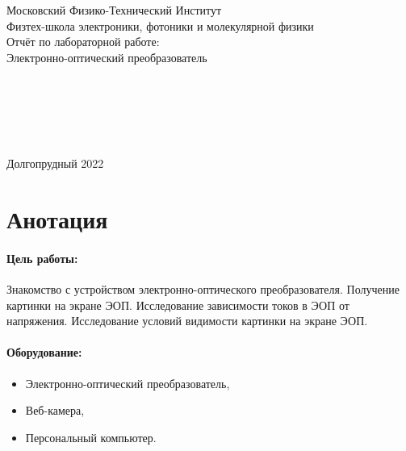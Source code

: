 \documentclass[a4paper,12pt]{article} %
\begin{document}



\begin{center}
{\LARGE Московский Физико-Технический Институт}
\\
{\large Физтех-школа электроники, фотоники и молекулярной физики }
\\
\vspace{8cm}
{\LARGE Отчёт по лабораторной работе:}
\\
{\Huge Электронно-оптический преобразователь} 
\\
\vspace{5cm}
\raggedright 
\hspace{8cm}{\large Выполнили работу студенты }\\
\hspace{8cm}{\large группы Б04-005:}\\
\hspace{8cm}{\large Давыдов Владислав}\\
\hspace{8cm}{\large Карташов Констанин}\\
\hspace{8cm}{\large Корнеев Николай}\\

\vspace{\fill}
\center
{\large Долгопрудный 2022}

\end{center}

\newpage


\section{Анотация}

\paragraph{Цель работы:} 
Знакомство с устройством электронно-оптического преобразователя. Получение картинки на экране ЭОП. Исследование зависимости токов в ЭОП от напряжения. Исследование условий видимости картинки на экране ЭОП.

\paragraph{Оборудование:}
\begin{itemize}
\renewcommand{\labelitemi}{$\triangleright$}
\itemsep0em
\item Электронно-оптический преобразователь,
\item Веб-камера,
\item Персональный компьютер.
\end{itemize}
\end{document}
